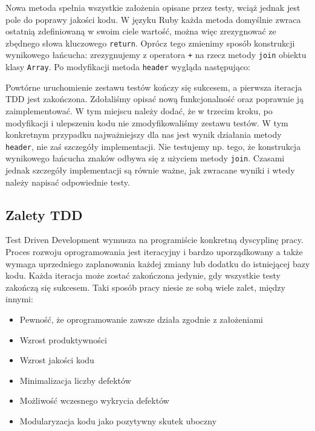     Nowa metoda spełnia wszystkie założenia opisane przez testy, wciąż jednak jest pole do poprawy jakości kodu. W języku Ruby każda metoda domyślnie zwraca ostatnią zdefiniowaną w swoim ciele wartość, można więc zrezygnować ze zbędnego słowa kluczowego \texttt{return}. Oprócz tego zmienimy sposób konstrukcji wynikowego łańcucha: zrezygnujemy z operatora \texttt{+} na rzecz metody \texttt{join} obiektu klasy \texttt{Array}. Po modyfikacji metoda \texttt{header} wygląda następująco:
    
    
    
  Powtórne uruchomienie zestawu testów kończy się sukcesem, a pierwsza iteracja TDD jest zakończona. Zdołaliśmy opisać nową funkcjonalność oraz poprawnie ją zaimplementować. W tym miejscu należy dodać, że w trzecim kroku, po modyfikacji i ulepszeniu kodu nie zmodyfikowaliśmy zestawu testów. W tym konkretnym przypadku najważniejszy dla nas jest wynik działania metody \texttt{header}, nie zaś szczegóły implementacji. Nie testujemy np. tego, że konstrukcja wynikowego łańcucha znaków odbywa się z użyciem metody \texttt{join}. Czasami jednak szczegóły implementacji są równie ważne, jak zwracane wyniki i wtedy należy napisać odpowiednie testy.
    
  \subsection{Zalety TDD}
    Test Driven Development wymusza na programiście konkretną dyscyplinę pracy. Proces rozwoju oprogramowania jest iteracyjny i bardzo uporządkowany a także wymaga uprzedniego zaplanowania każdej zmiany lub dodatku do istniejącej bazy kodu. Każda iteracja może zostać zakończona jedynie, gdy wszystkie testy zakończą się sukcesem. Taki sposób pracy niesie ze sobą wiele zalet, między innymi:
     
    \begin{itemize}
      \item Pewność, że oprogramowanie zawsze działa zgodnie z założeniami
      \item Wzrost produktywności
      \item Wzrost jakości kodu
      \item Minimalizacja liczby defektów
      \item Możliwość wczesnego wykrycia defektów
      \item Modularyzacja kodu jako pozytywny skutek uboczny
    \end{itemize}

